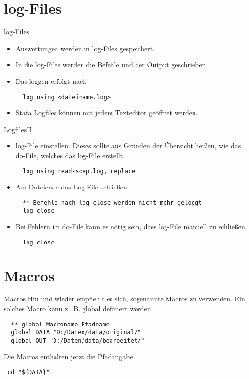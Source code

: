 \section{log-Files}
\begin{frame}[fragile]{log-Files}  
  \begin{itemize}
    \item Auswertungen werden in log-Files gespeichert.
    \item In die log-Files werden die Befehle und der Output geschrieben.
    \item Das loggen erfolgt nach 
    \begin{lstlisting}
  log using <dateiname.log>
    \end{lstlisting}
    \item Stata Logfiles können mit jedem Texteditor geöffnet werden.
  \end{itemize}
\end{frame}

\begin{frame}[fragile]{LogfilesII}
  \begin{itemize}   
   \item log-File einstellen. Dieses sollte aus Gründen der Übersicht heißen, wie das do-File, welches das log-File erstellt. 
   \begin{lstlisting}
  log using read-soep.log, replace
   \end{lstlisting}
   \item Am Dateiende das Log-File schließen.
   \begin{lstlisting}
  ** Befehle nach log close werden nicht mehr geloggt
  log close
   \end{lstlisting}
     \item Bei Fehlern im do-File kann es nötig sein, dass log-File manuell zu schließen
     \begin{lstlisting}
  log close
     \end{lstlisting}
  \end{itemize}
\end{frame}

\section{Macros}
\begin{frame}[fragile]{Macros}  
Hin und wieder empfiehlt es sich, sogenannte Macros zu verwenden. Ein solches Macro kann z.~B. global definiert werden.
\begin{lstlisting}
  ** global Macroname Pfadname
  global DATA "D:/Daten/data/original/"
  global OUT "D:/Daten/data/bearbeitet/"
\end{lstlisting}
Die Macros enthalten jetzt die Pfadangabe
\begin{lstlisting}
 cd "${DATA}"
\end{lstlisting}

\end{frame}

